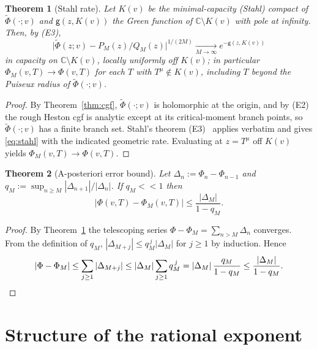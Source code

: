 \documentclass[11pt]{article}
\newtheorem{theorem}{Theorem}[section]
\newcommand{\C}{\mathbb{C}}
\begin{document}
\begin{theorem}[Stahl rate]\label{thm:stahl}
Let $K(v)$ be the minimal-capacity (Stahl) compact of
$\widetilde\Phi(\cdot;v)$ and $\mathsf g(z,K(v))$ the Green function of
$\C\setminus K(v)$ with pole at infinity. Then, by \textup{(E3)},
\begin{equation}\label{eq:stahl}
\bigl|\widetilde\Phi(z;v)-P_M(z)/Q_M(z)\bigr|^{1/(2M)}
\xrightarrow[M\to\infty]{}e^{-\mathsf g(z,K(v))}
\end{equation}
in capacity on $\C\setminus K(v)$, locally uniformly off $K(v)$; in
particular $\Phi_M(v,T)\to\Phi(v,T)$ for each $T$ with $T^{\mu}\notin K(v)$,
including $T$ beyond the Puiseux radius of $\widetilde\Phi(\cdot;v)$.
\end{theorem}

\begin{proof}
By Theorem~\ref{thm:cgf}, $\widetilde\Phi(\cdot;v)$ is holomorphic at the
origin, and by \textup{(E2)} the rough Heston cgf is analytic except at its
critical-moment branch points, so $\widetilde\Phi(\cdot;v)$ has a finite
branch set. Stahl's theorem \textup{(E3)}~\cite{Stahl} applies verbatim and
gives \eqref{eq:stahl} with the indicated geometric rate. Evaluating at
$z=T^{\mu}$ off $K(v)$ yields $\Phi_M(v,T)\to\Phi(v,T)$.
\end{proof}

\begin{theorem}[A-posteriori error bound]\label{thm:apost}
Let $\Delta_n:=\Phi_n-\Phi_{n-1}$ and
$q_M:=\sup_{n\ge M}|\Delta_{n+1}|/|\Delta_n|$. If $q_M<<1$ then
\begin{equation}\label{eq:apost}
\bigl|\Phi(v,T)-\Phi_M(v,T)\bigr|\le\frac{|\Delta_M|}{1-q_M}.
\end{equation}
\end{theorem}

\begin{proof}
By Theorem~\ref{thm:stahl} the telescoping series
$\Phi-\Phi_M=\sum_{n>M}\Delta_n$ converges. From the definition of $q_M$,
$|\Delta_{M+j}|\le q_M^{\,j}|\Delta_M|$ for $j\ge1$ by induction. Hence
\begin{equation}\label{eq:apost-pf}
|\Phi-\Phi_M|\le\sum_{j\ge1}|\Delta_{M+j}|
\le|\Delta_M|\sum_{j\ge1}q_M^{\,j}
=|\Delta_M|\,\frac{q_M}{1-q_M}\le\frac{|\Delta_M|}{1-q_M}.\qedhere
\end{equation}
\end{proof}

\section{Structure of the rational exponent}\label{sec:struct}
\end{document}
